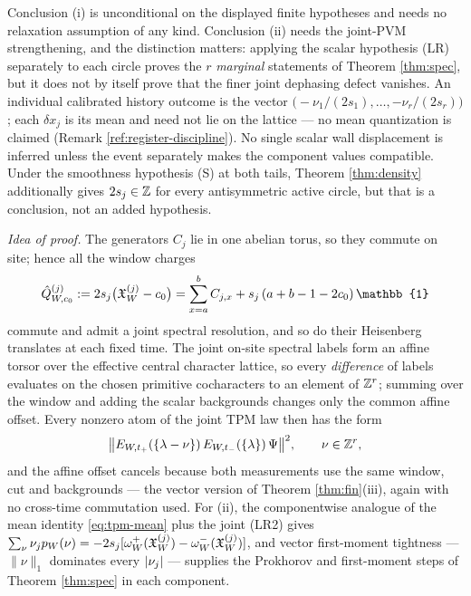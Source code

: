 \begin{scope}
Conclusion (i) is unconditional on the displayed finite hypotheses and needs
no relaxation assumption of any kind. Conclusion (ii) needs the joint-PVM
strengthening, and the distinction matters: applying the scalar hypothesis
(LR) separately to each circle proves the $r$ \emph{marginal} statements of
Theorem \ref{thm:spec}, but it does not by itself prove that the finer joint
dephasing defect vanishes. An individual calibrated history outcome is the
vector $\bigl(-\nu_1/(2s_1),\dots,-\nu_r/(2s_r)\bigr)$; each $\delta x_j$ is
its mean and need not lie on the lattice --- no mean quantization is claimed
(Remark \ref{ref:register-discipline}). No single scalar wall displacement is
inferred unless the event separately makes the component values compatible.
Under the smoothness hypothesis (S) at both tails, Theorem \ref{thm:density}
additionally gives $2s_j\in\mathbb{Z}$ for every antisymmetric active circle, but that
is a conclusion, not an added hypothesis.
\end{scope}

\emph{Idea of proof.} The generators $C_j$ lie in one abelian torus, so they
commute on site; hence all the window charges
\begin{equation}
  \Qhat^{(j)}_{W,c_0}:=2s_j\bigl(\wallX^{(j)}_W-c_0\bigr)
   =\sum_{x=a}^{b}C_{j,x}+s_j\,(a+b-1-2c_0)\,\mathbb{1}
  \label{eq:torus-charges}
\end{equation}
commute and admit a joint spectral resolution, and so do their Heisenberg
translates at each fixed time. The joint on-site spectral labels form an
affine torsor over the effective central character lattice, so every
\emph{difference} of labels evaluates on the chosen primitive cocharacters to
an element of $\mathbb{Z}^r$; summing over the window and adding the scalar
backgrounds changes only the common affine offset. Every nonzero atom of the
joint TPM law then has the form
\begin{equation}
  \bigl\lVert E_{W,t_+}(\{\lambda-\nu\})\,
              E_{W,t_-}(\{\lambda\})\,\Psi\bigr\rVert^{2},
  \qquad \nu\in\mathbb{Z}^{r},
  \label{eq:torus-atom}
\end{equation}
and the affine offset cancels because both measurements use the same window,
cut and backgrounds --- the vector version of Theorem \ref{thm:fin}(iii),
again with no cross-time commutation used. For (ii), the componentwise
analogue of the mean identity \eqref{eq:tpm-mean} plus the joint (LR2) gives
$\sum_\nu\nu_j p_W(\nu)
 =-2s_j[\omega^{+}_W(\mathfrak{X}^{(j)}_W)-\omega^{-}_W(\mathfrak{X}^{(j)}_W)]$, and
vector first-moment tightness --- $\lVert\nu\rVert_1$ dominates every
$\lvert \nu_j\rvert$ --- supplies the Prokhorov and first-moment steps of Theorem
\ref{thm:spec} in each component.

